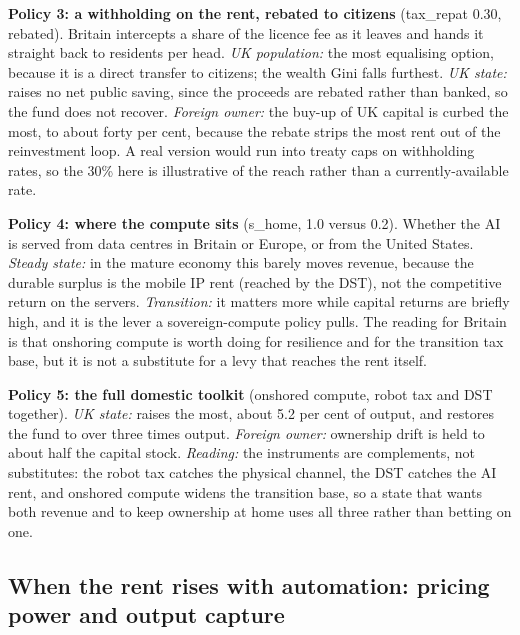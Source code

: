 \documentclass[11pt]{article}
\begin{document}
\textbf{Policy 3: a withholding on the rent, rebated to citizens}
(tax\_repat 0.30, rebated). Britain intercepts a share of the licence
fee as it leaves and hands it straight back to residents per head.
\emph{UK population:} the most equalising option, because it is a direct
transfer to citizens; the wealth Gini falls furthest. \emph{UK state:}
raises no net public saving, since the proceeds are rebated rather than
banked, so the fund does not recover. \emph{Foreign owner:} the buy-up
of UK capital is curbed the most, to about forty per cent, because the
rebate strips the most rent out of the reinvestment loop. A real version
would run into treaty caps on withholding rates, so the 30\% here is
illustrative of the reach rather than a currently-available rate.

\textbf{Policy 4: where the compute sits} (s\_home, 1.0 versus 0.2).
Whether the AI is served from data centres in Britain or Europe, or from
the United States. \emph{Steady state:} in the mature economy this
barely moves revenue, because the durable surplus is the mobile IP rent
(reached by the DST), not the competitive return on the servers.
\emph{Transition:} it matters more while capital returns are briefly
high, and it is the lever a sovereign-compute policy pulls. The reading
for Britain is that onshoring compute is worth doing for resilience and
for the transition tax base, but it is not a substitute for a levy that
reaches the rent itself.

\textbf{Policy 5: the full domestic toolkit} (onshored compute, robot
tax and DST together). \emph{UK state:} raises the most, about 5.2 per
cent of output, and restores the fund to over three times output.
\emph{Foreign owner:} ownership drift is held to about half the capital
stock. \emph{Reading:} the instruments are complements, not substitutes:
the robot tax catches the physical channel, the DST catches the AI rent,
and onshored compute widens the transition base, so a state that wants
both revenue and to keep ownership at home uses all three rather than
betting on one.

\hypertarget{when-the-rent-rises-with-automation-pricing-power-and-output-capture}{%
\subsection{When the rent rises with automation: pricing power and
output
capture}\label{when-the-rent-rises-with-automation-pricing-power-and-output-capture}}
\end{document}
